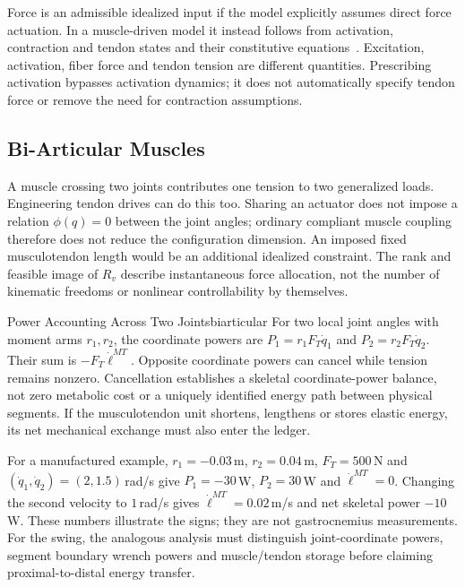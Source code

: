 Force is an admissible idealized input if the model explicitly assumes direct
force actuation. In a muscle-driven model it instead follows from activation,
contraction and tendon states and their constitutive equations~\cite{millard2013flexing}.
Excitation, activation, fiber force and tendon tension are different quantities.
Prescribing activation bypasses activation dynamics; it does not automatically
specify tendon force or remove the need for contraction assumptions.

\subsection{Bi-Articular Muscles}

A muscle crossing two joints contributes one tension to two generalized loads.
Engineering tendon drives can do this too. Sharing an actuator does not impose
a relation $\phi(q)=0$ between the joint angles; ordinary compliant muscle
coupling therefore does not reduce the configuration dimension.
An imposed fixed musculotendon length would be an additional idealized constraint.
The rank and feasible image of $R_v$ describe instantaneous force allocation,
not the number of kinematic freedoms or nonlinear controllability by themselves.

\begin{principle}{Power Accounting Across Two Joints}{biarticular}
For two local joint angles with moment arms $r_1,r_2$, the coordinate powers are
$P_1=r_1F_T\dot q_1$ and $P_2=r_2F_T\dot q_2$.
Their sum is $-F_T\dot\ell^{MT}$.
Opposite coordinate powers can cancel while tension remains nonzero.
Cancellation establishes a skeletal coordinate-power balance, not zero
metabolic cost or a uniquely identified energy path between physical segments.
If the musculotendon unit shortens, lengthens or stores elastic energy, its
net mechanical exchange must also enter the ledger.
\end{principle}

For a manufactured example, $r_1=-0.03$\,m, $r_2=0.04$\,m,
$F_T=500$\,N and $(\dot q_1,\dot q_2)=(2,1.5)$\,rad/s give
$P_1=-30$\,W, $P_2=30$\,W and $\dot\ell^{MT}=0$.
Changing the second velocity to $1$\,rad/s gives $\dot\ell^{MT}=0.02$\,m/s
and net skeletal power $-10$\,W.
These numbers illustrate the signs; they are not gastrocnemius measurements.
For the swing, the analogous analysis must distinguish joint-coordinate powers,
segment boundary wrench powers and muscle/tendon storage before claiming
proximal-to-distal energy transfer.

